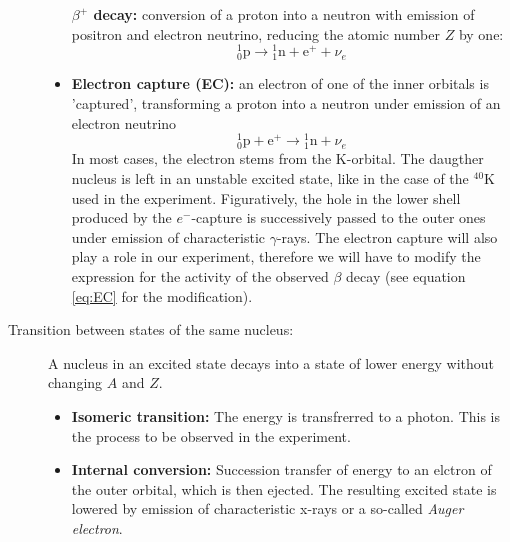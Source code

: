 \begin{description}
\begin{itemize}
                \textbf{$\beta^+$ decay:} conversion of a proton into a neutron with emission of positron and 
                electron neutrino, reducing the atomic number $Z$ by one:
                \begin{equation}
                    {}^{1}_{0} \mathrm {p} \to {}^{1}_{1} \mathrm {n} + \mathrm{e}^{+} + \nu_e 
                \end{equation}
            \item
                \textbf{Electron capture (EC):} an electron of one of the inner orbitals is 'captured', transforming a proton 
                into a neutron under emission of an electron neutrino
                \begin{equation}
                    {}^{1}_{0} \mathrm {p} + \mathrm{e}^{+} \to {}^{1}_{1} \mathrm {n} + \nu_e 
                \end{equation}
                In most cases, the electron stems from the K-orbital. The daugther nucleus is left in 
                an unstable excited state, like in the case of the $^{40}$K used in the experiment. 
                Figuratively, the hole in the lower shell produced by the $e^-$-capture is successively 
                passed to the outer ones under emission of characteristic $\gamma$-rays. The
                electron capture will also play a role in our experiment, therefore we will
                have to modify the expression for the activity of the observed $\beta$ decay (see equation
                \eqref{eq:EC} for the modification).

        \end{itemize}
    \item [Transition between states of the same nucleus:] 
        A nucleus in an excited state decays into a state of 
        lower energy without changing $A$ and $Z$.
        \begin{itemize}
            \item
                \textbf{Isomeric transition:} The energy is transfrerred to a photon. This is the process to be observed 
                in the experiment. 
            \item
                \textbf{Internal conversion:} Succession transfer of energy to an elctron of the outer orbital, 
                which is then ejected. The resulting excited state is lowered by emission of characteristic 
                x-rays or a so-called \emph{Auger electron}. 
        \end{itemize}
\end{description}

